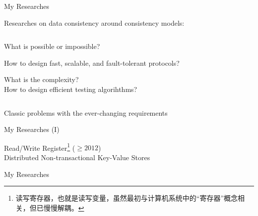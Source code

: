 \begin{frame}{My Researches}
	\begin{center}
		Researches on data consistency around consistency models:
	\end{center}

	\begin{columns}
		\begin{description}[Computability]
			\setlength{\itemsep}{8pt}
			\item[Computability:] What is possible or impossible?
			\item[Protocol:] How to design fast, scalable, and fault-tolerant protocols?
			\item[Testing:] What is the complexity? \\[3pt] How to design efficient testing algorihthms?
		\end{description}
	\end{columns}

	\pause
	\vspace{0.60cm}
	\begin{center}
		Classic problems with the ever-changing requirements
	\end{center}
\end{frame}

\begin{frame}{My Researches (I)}
	\begin{center}
		Read/Write Register\footnote{读写寄存器，也就是读写变量，虽然最初与计算机系统中的``寄存器''概念相关，但已慢慢解耦。} ($\ge 2012$) \\[6pt]

		Distributed Non-transactional Key-Value Stores
	\end{center}
\end{frame}

\begin{frame}{My Researches}

	\vspace{0.30cm}

	\vspace{0.30cm}
\end{frame}

